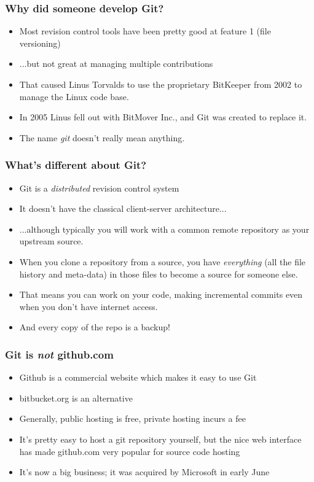 \documentclass{beamer}
\begin{document}
\begin{frame}
  \frametitle{Why did someone develop Git?}
  \begin{itemize}
    \pause \item Most revision control tools have been pretty good at
    feature 1 (file versioning)
    \pause \item ...but not great at managing multiple contributions
    \pause \item That caused Linus Torvalds to use the proprietary
    BitKeeper from 2002 to manage the Linux code base.
    \pause \item In 2005 Linus fell out with BitMover Inc., and Git was
    created to replace it.
    \pause \item The name \emph{git} doesn't really mean anything.
  \end{itemize}
\end{frame}

\begin{frame}
  \frametitle{What's different about Git?}
  \begin{itemize}
  \item Git is a \emph{distributed} revision control system
  \pause \item It doesn't have the classical client-server architecture...
  \pause \item ...although typically you will work with a common
  \alert{remote} repository as your \alert{upstream} source.
  \pause \item When you \alert{clone} a repository from a source, you have
    \emph{everything} (all the file history and meta-data) in those
    files to become a source for someone else.
  \pause \item That means you can work on your code, making incremental
  \alert{commits} even when you don't have internet access.
  \pause \item And every copy of the \alert{repo} is a backup!
  \end{itemize}
\end{frame}

\begin{frame}
  \frametitle{Git is \emph{not} github.com}
  \begin{itemize}
  \item Github is a commercial website which makes it easy to use Git
  \item bitbucket.org is an alternative
  \pause \item Generally, public hosting is free, private hosting
  incurs a fee
  \pause \item It's pretty easy to host a git repository yourself, but
  the nice web interface has made github.com very
  popular for source code hosting
  \pause \item It's now a big business; it was acquired by Microsoft in early June
  \end{itemize}
\end{frame}
\end{document}
